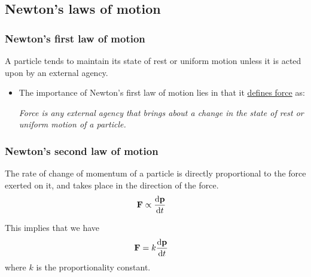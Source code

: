     \subsection{Newton's laws of motion}
    
	    \subsubsection{Newton's first law of motion}
	    	\begin{tcolorbox}[colframe=black, colback=lightgray, opacityfill=0.2, arc=0mm]
	    		A particle tends to maintain its state of rest or uniform motion unless it is acted upon by an external agency.
	    	\end{tcolorbox}\vspace{-2.5ex}
	    	\begin{itemize}
	    		\item The importance of Newton's first law of motion lies in that it \ul{defines force} as:
	    		
	    		\emph{Force is any external agency that brings about a change in the state of rest or uniform motion of a particle.}
	    	\end{itemize}
	    
	    \subsubsection{Newton's second law of motion}
	    	\begin{tcolorbox}[colframe=black, colback=lightgray, opacityfill=0.2, arc=0mm]
	    		The rate of change of momentum of a particle is directly proportional to the force exerted on it, and takes place in the direction of the force.
	    		\begin{align*}
	    			\vb{F}&\propto\dv{\vb{p}}{t}
	    		\end{align*}
	    	\end{tcolorbox}%
	    	
	    	This implies that we have
	    	\begin{align*}
	    		\vb{F}&=k\dv{\vb{p}}{t}
	    	\end{align*}
	    	where $k$ is the proportionality constant.
	    	
